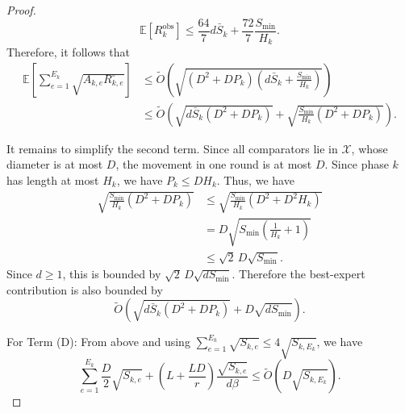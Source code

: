 \documentclass[journal,onecolumn]{IEEEtran}
\theoremstyle{plain}
\theoremstyle{definition}
\theoremstyle{remark}
\begin{document}
{\begin{proof}
\begin{equation*}
    \mathbb E[R_k^{\mathrm{obs}}]
    \le
    \frac{64}{7}d\bar S_k
    +
    \frac{72}{7}\frac{S_{\min}}{H_k}.
\end{equation*}
Therefore, it follows that
\begin{align*}
    \mathbb E\left[
        \sum_{e=1}^{E_k}
        \sqrt{A_{k,e}R_{k,e}^{\circ}}
    \right]
    &\le
    \widetilde O\left(
        \sqrt{
            (D^2+DP_k)
            \left(
                d\bar S_k+\frac{S_{\min}}{H_k}
            \right)
        }
    \right) \\
    &\le
    \widetilde O\left(
        \sqrt{d\bar S_k(D^2+DP_k)}
        +
        \sqrt{
            \frac{S_{\min}}{H_k}(D^2+DP_k)
        }
    \right).
\end{align*}

It remains to simplify the second term. Since all comparators lie in
$\mathcal X$, whose diameter is at most $D$, the movement in one round is at
most $D$. Since phase $k$ has length at most $H_k$, we have $P_k\le DH_k$.
Thus, we have
\begin{equation*}
\begin{aligned}
    \sqrt{
        \frac{S_{\min}}{H_k}(D^2+DP_k)
    }
    &\le
    \sqrt{
        \frac{S_{\min}}{H_k}(D^2+D^2H_k)
    }  \\
    &=
    D\sqrt{
        S_{\min}\left(\frac{1}{H_k}+1\right)
    }  \\
    &\le
    \sqrt2\,D\sqrt{S_{\min}}.
\end{aligned}
\end{equation*}
Since $d\ge1$, this is bounded by $\sqrt2\,D\sqrt{dS_{\min}}$. Therefore the best-expert contribution is also bounded by
\begin{equation*}
    \widetilde O\left(
        \sqrt{d\bar S_k(D^2+DP_k)}
        +
        D\sqrt{dS_{\min}}
    \right).
\end{equation*}

For Term (D): From above and using $\sum_{e=1}^{E_k} \sqrt{S_{k,e}} \le 4\sqrt{S_{k,E_k}}$, we have
\begin{equation*}
\sum_{e=1}^{E_k} \frac{D}{2}\sqrt{S_{k,e}}+\left(L+\frac{LD}{r}\right)\frac{\sqrt{S_{k,e}}}{d\beta} \le \widetilde{O}\left( D\sqrt{S_{k,E_k}}\right).
\end{equation*}


\end{proof}}
\end{document}
